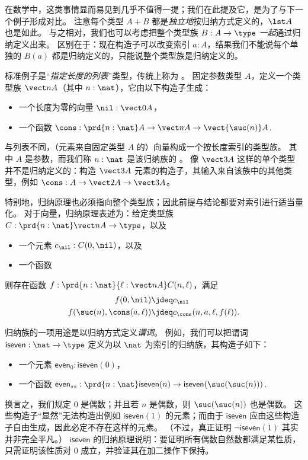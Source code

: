 在数学中，这类事情显而易见到几乎不值得一提；我们在此提及它，是为了与下一个例子形成对比。
注意每个类型 $A+B$ 都是\emph{独立地}按归纳方式定义的，$\lst A$ 也是如此。
%
%
与之相对，我们也可以考虑把整个类型族 $B:A\to\type$ \emph{一起}通过归纳定义出来。
区别在于：现在构造子可以改变索引 $a:A$，结果我们不能说每个单独的 $B(a)$ 都是归纳定义的，只能说整个类型族是归纳定义的。

%
%
标准例子是“\emph{指定长度的列表}”类型，传统上称为 。
固定参数类型 $A$，定义一个类型族 $\vect n A$（其中 $n:\nat$），它由以下构造子生成：
\begin{itemize}
\item 一个长度为零的向量 $\nil:\vect 0 A$，
\item 一个函数 $\cons:\prd{n:\nat} A\to \vect n A \to \vect{\suc (n)} A$.
\end{itemize}
与列表不同，（元素来自固定类型 $A$ 的）向量构成一个按长度索引的类型族。
其中 $A$ 是参数，而我们称 $n:\nat$ 是该归纳族的 
%
。
像 $\vect3A$ 这样的单个类型并不是归纳定义的：构造 $\vect3A$ 元素的构造子，其输入来自该族中的其他类型，例如 $\cons:A \to \vect2A \to \vect3A$。

特别地，归纳原理也必须指向整个类型族；因此前提与结论都要对索引进行适当量化。
对于向量，归纳原理表述为：给定类型族 $C:\prd{n:\nat} \vect n A \to \type$，以及
\begin{itemize}
\item 一个元素 $c_\nil : C(0,\nil)$，以及
\item 一个函数 
\end{itemize}
则存在函数 $f:\prd{n:\nat}{\ell:\vect n A} C(n,\ell)$，满足
\begin{align*}
  f(0,\nil) &\jdeq c_\nil\\
  f(\suc(n),\cons(a,\ell)) &\jdeq c_\cons(n,a,\ell,f(\ell)).
\end{align*}

%
%
归纳族的一项用途是以归纳方式定义\emph{谓词}。
例如，我们可以把谓词 $\mathsf{iseven}:\nat\to\type$ 定义为以 $\nat$ 为索引的归纳族，其构造子如下：
\begin{itemize}
\item 一个元素 $\mathsf{even}_0 : \mathsf{iseven}(0)$，
\item 一个函数 $\mathsf{even}_{ss} : \prd{n:\nat} \mathsf{iseven}(n) \to \mathsf{iseven}(\suc(\suc(n)))$.
\end{itemize}
换言之，我们规定 $0$ 是偶数；并且若 $n$ 是偶数，则 $\suc(\suc(n))$ 也是偶数。
这些构造子“显然”无法构造出例如 $\mathsf{iseven}(1)$ 的元素；而由于 $\mathsf{iseven}$ 应由这些构造子自由生成，因此必定不存在这样的元素。
（不过，真正证明 $\neg \mathsf{iseven}(1)$ 其实并非完全平凡。）
$\mathsf{iseven}$ 的归纳原理说明：要证明所有偶数自然数都满足某性质，只需证明该性质对 $0$ 成立，并验证其在加二操作下保持。

